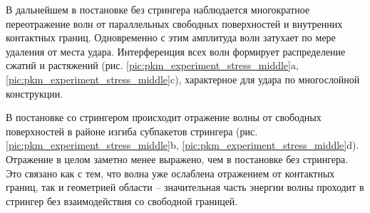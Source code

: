 В дальнейшем в постановке без стрингера наблюдается многократное переотражение волн от параллельных свободных поверхностей и внутренних контактных границ. Одновременно с этим амплитуда волн затухает по мере удаления от места удара. Интерференция всех волн формирует распределение сжатий и растяжений (рис. \ref{pic:pkm_experiment_stress_middle}a, \ref{pic:pkm_experiment_stress_middle}c), характерное для удара по многослойной конструкции.

В постановке со стрингером происходит отражение волны от свободных поверхностей в районе изгиба субпакетов стрингера (рис. \ref{pic:pkm_experiment_stress_middle}b, \ref{pic:pkm_experiment_stress_middle}d). Отражение в целом заметно менее выражено, чем в постановке без стрингера. Это связано как с тем, что волна уже ослаблена отражением от контактных границ, так и геометрией области -- значительная часть энергии волны проходит в стрингер без взаимодействия со свободной границей.


